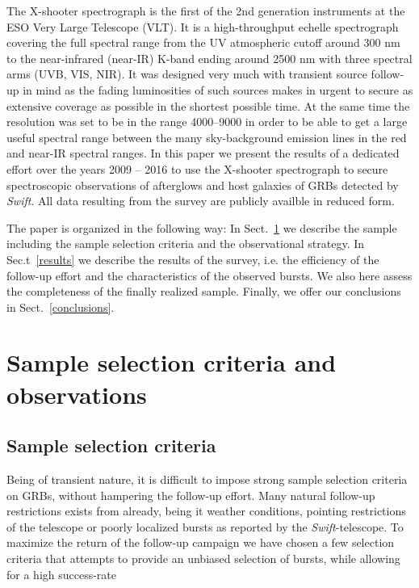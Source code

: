 \documentclass{aa}    %
\begin{document}
The X-shooter spectrograph \citep{Vernet2011} is the first of the 2nd
generation instruments at the ESO Very Large Telescope (VLT). It is a
high-throughput echelle spectrograph covering the full spectral range from the
UV atmospheric cutoff around 300 nm to the near-infrared (near-IR) K-band 
ending around 2500 nm with three spectral
arms (UVB, VIS, NIR). It was designed very much with transient source follow-up
in mind as the fading luminosities of such sources makes in urgent to secure as
extensive coverage as possible in the shortest possible time. At the same time
the resolution was set to be in the range 4000--9000 in order to be able to get
a large useful spectral range between the many sky-background emission lines in
the red and near-IR spectral ranges. In this paper we present the results
of a dedicated effort over the years 2009 -- 2016 to use the X-shooter
spectrograph to secure spectroscopic observations of
afterglows and host galaxies of GRBs detected by {\it Swift}. 
All data resulting from the survey are publicly availble in reduced form.

The paper is organized in the following way: In Sect.~\ref{sample} we describe
the sample including the sample selection criteria and the observational
strategy.  In Sec.t~\ref{results} we describe the results of the survey, i.e.
the efficiency of the follow-up effort and the characteristics of the observed
bursts. We also here assess the completeness of the finally realized sample.
Finally, we offer our conclusions in Sect.~\ref{conclusions}.


\section{Sample selection criteria and observations}\label{sample}


\subsection{Sample selection criteria} \label{samplecrit}
Being of transient nature, it is difficult to impose strong sample selection
criteria on GRBs, without hampering the follow-up effort. Many natural follow-up
restrictions exists from already, being it weather conditions, pointing
restrictions of the telescope or poorly localized bursts as reported by the
\textit{Swift}-telescope. To maximize the return of the follow-up campaign
we have chosen a few selection criteria that attempts to provide an unbiased
selection of bursts, while allowing for a high success-rate 
\end{document}
